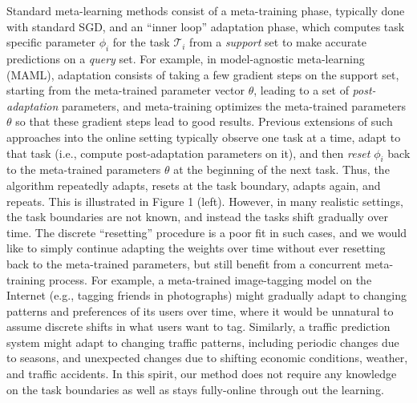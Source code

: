 \begin{figure*}[!t]
    \label{fig:oml1}
\end{figure*}

Standard meta-learning methods consist of a meta-training phase, typically done with standard SGD, and an ``inner loop'' adaptation phase, which computes task specific parameter $\phi_i$ for the task $\mathcal{T}_i$ from a \emph{support} set to make accurate predictions on a \emph{query} set. For example, in model-agnostic meta-learning (MAML), adaptation consists of taking a few gradient steps on the support set, starting from the meta-trained parameter vector $\theta$, leading to a set of \emph{post-adaptation} parameters, and meta-training optimizes the meta-trained parameters $\theta$ so that these gradient steps lead to good results. Previous extensions of such approaches into the online setting typically observe one task at a time, adapt to that task (i.e., compute post-adaptation parameters on it), and then \emph{reset} $\phi_i$ back to the meta-trained parameters $\theta$ at the beginning of the next task. Thus, the algorithm repeatedly adapts, resets at the task boundary, adapts again, and repeats. This is illustrated in Figure 1 (left). However, in many realistic settings, the task boundaries are not known, and instead the tasks shift gradually over time. The discrete ``resetting'' procedure is a poor fit in such cases, and we would like to simply continue adapting the weights over time without ever resetting back to the meta-trained parameters, but still benefit from a concurrent meta-training process. For example, a meta-trained image-tagging model on the Internet (e.g., tagging friends in photographs) might gradually adapt to changing patterns and preferences of its users over time, where it would be unnatural to assume discrete shifts in what users want to tag. Similarly, a traffic prediction system might adapt to changing traffic patterns, including periodic changes due to seasons, and unexpected changes due to shifting economic conditions, weather, and traffic accidents. In this spirit, our method does not require any knowledge on the task boundaries as well as stays fully-online through out the learning. 


